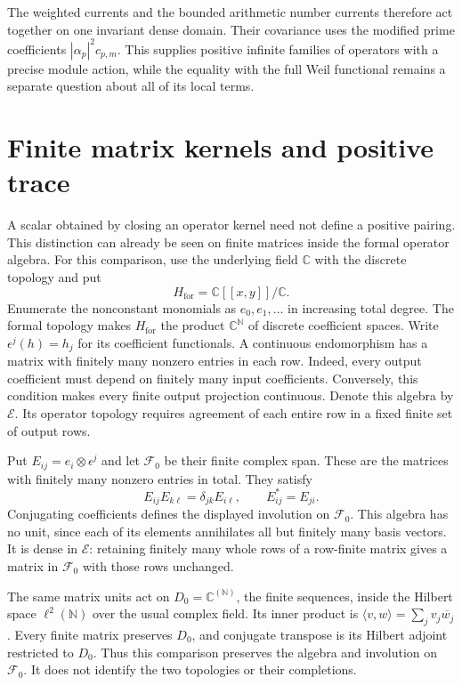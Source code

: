 \documentclass[11pt]{article}
\theoremstyle{definition}
\theoremstyle{remark}
\numberwithin{equation}{section}
\newcommand{\C}{\mathbb C}
\begin{document}
The weighted currents and the bounded arithmetic number currents therefore
act together on one invariant dense domain.
Their covariance uses the modified prime coefficients
$|\alpha_p|^2c_{p,m}$.
This supplies positive infinite families of operators with a precise
module action, while the equality with the full Weil functional remains
a separate question about all of its local terms.


\section{Finite matrix kernels and positive trace}
\label{sec:weil-formal-kernels}

A scalar obtained by closing an operator kernel need not define a
positive pairing.  This distinction can already be seen on finite
matrices inside the formal operator algebra.
For this comparison, use the underlying field $\C$ with the discrete
topology and put
\[
 H_{\mathrm{for}}=\C[[x,y]]/\C.
\]
Enumerate the nonconstant monomials as $e_0,e_1,\ldots$ in increasing
total degree.  The formal topology makes $H_{\mathrm{for}}$ the product
$\C^{\mathbb N}$ of discrete coefficient spaces.  Write
$\epsilon^j(h)=h_j$ for its coefficient functionals.
A continuous endomorphism has a matrix with finitely many nonzero entries
in each row.  Indeed, every output coefficient must depend on finitely
many input coefficients.  Conversely, this condition makes every finite
output projection continuous.  Denote this algebra by $\mathscr E$.
Its operator topology requires agreement of each entire row in a fixed
finite set of output rows.

Put $E_{ij}=e_i\otimes\epsilon^j$ and let $\mathscr F_0$ be their
finite complex span.  These are the matrices with finitely many nonzero
entries in total.  They satisfy
\[
 E_{ij}E_{k\ell}=\delta_{jk}E_{i\ell},\qquad
 E_{ij}^*=E_{ji}.
\]
Conjugating coefficients defines the displayed involution on
$\mathscr F_0$.  This algebra has no unit, since each of its elements
annihilates all but finitely many basis vectors.
It is dense in $\mathscr E$: retaining finitely many whole rows of a
row-finite matrix gives a matrix in $\mathscr F_0$ with those rows unchanged.

The same matrix units act on $D_0=\C^{(\mathbb N)}$, the finite sequences,
inside the Hilbert space $\ell^2(\mathbb N)$ over the usual complex field.
Its inner product is $\langle v,w\rangle=\sum_jv_j\overline{w_j}$.
Every finite matrix preserves $D_0$, and conjugate transpose is its
Hilbert adjoint restricted to $D_0$.  Thus this comparison preserves the
algebra and involution on $\mathscr F_0$.  It does not identify the two
topologies or their completions.
\end{document}
